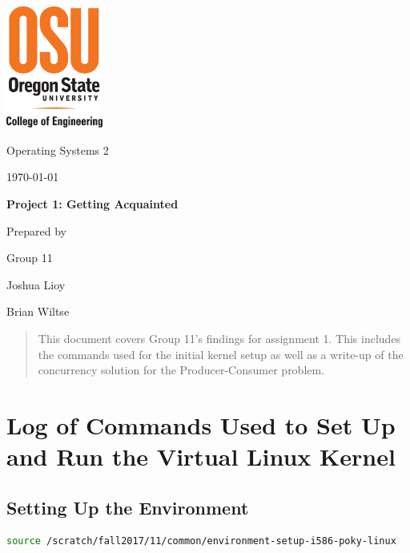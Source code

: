 \documentclass[letterpaper, onecolumn, draftclsnofoot, 10pt, compsoc]{IEEEtran}
\def \GroupNumber{11}
\def \GroupMemberOne{Joshua Lioy}
\def \GroupMemberTwo{Brian Wiltse}
\begin{document}
\begin{titlepage}
    \begin{singlespace}
    	\includegraphics[height=4cm]{coe_v_spot1}
        \hfill 
        \par\vspace{.2in}
        \centering
        \scshape{
            \huge Operating Systems 2 \par
            {\large\today}\par
            \vspace{.5in}
            \textbf{\Huge Project 1: Getting Acquainted}\par
            \vfill
            \vspace{5pt}
            {\large Prepared by }\par
            Group \GroupNumber\par
            \vspace{5pt}
            {\Large
                \GroupMemberOne\par
                \GroupMemberTwo\par
            }
            \vspace{20pt}
        }
        \begin{abstract}
        This document covers Group 11's findings for assignment 1. This includes the commands used for the initial kernel setup as well as a write-up of the concurrency solution for the Producer-Consumer problem.
        \end{abstract}     
    \end{singlespace}
\end{titlepage}

\newpage
{}
\tableofcontents

\newpage
\section{Log of Commands Used to Set Up and Run the Virtual Linux Kernel}

    \subsection{Setting Up the Environment}
    \begin{lstlisting}[language=bash]
    source /scratch/fall2017/11/common/environment-setup-i586-poky-linux 
    \end{lstlisting}
    
\end{document}
